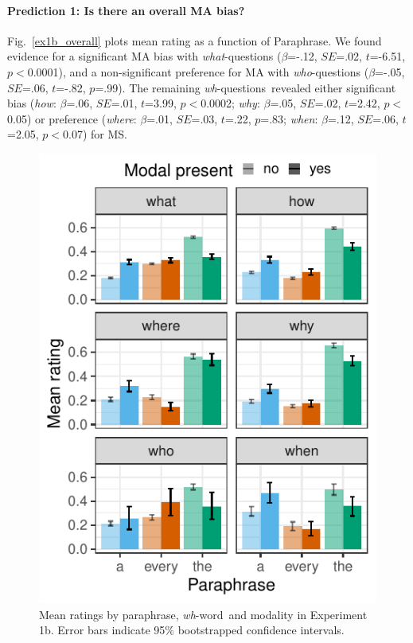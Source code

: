 \documentclass[12pt,letterpaper,table,svgnames,dvipsnames]{article}
\newcommand{\figref}[1]{Fig.~\ref{#1}}
\newcommand{\whqs}{\emph{wh}-questions~}
\newcommand{\whw}{\emph{wh}-word~}
\begin{document}
\paragraph{Prediction 1: Is there an overall MA bias?}
\figref{ex1b_overall} plots mean rating as a function of Paraphrase. We found evidence for a significant MA bias with \emph{what}-questions ($\beta$=-.12, $SE$=.02, $t$=-6.51, $p<$0.0001), and a non-significant preference for MA with \emph{who}-questions ($\beta$=-.05, $SE$=.06, $t$=-.82, $p$=.99). The remaining \whqs revealed either significant bias (\emph{how}: $\beta$=.06, $SE$=.01, $t$=3.99, $p<$0.0002; \emph{why}: $\beta$=.05, $SE$=.02, $t$=2.42, $p<$0.05) or preference (\emph{where}: $\beta$=.01, $SE$=.03, $t$=.22, $p$=.83; \emph{when}: $\beta$=.12, $SE$=.06, $t$=2.05, $p<$0.07) for MS. 

\begin{figure}[h!]
\centering
\includegraphics[scale=1]{figures/modxwh_eq_context.pdf}
\caption{Mean ratings by paraphrase, \whw and modality in Experiment 1b. Error bars indicate 95\% bootstrapped confidence intervals.} 
\label{ex1b_modXwh}
\end{figure}
\end{document}
